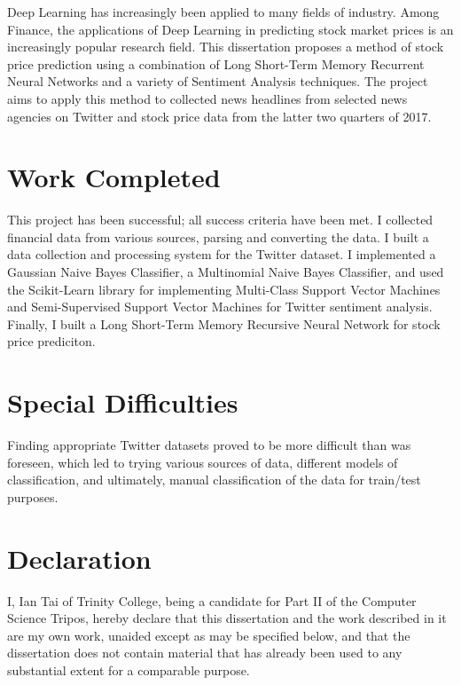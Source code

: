 \documentclass[12pt,a4paper,twoside,openright]{report}
\begin{document}
Deep Learning has increasingly been applied to many fields of industry. Among Finance,
the applications of Deep Learning in predicting stock market prices is an increasingly
popular research field. This dissertation proposes a method of stock price prediction
using a combination of Long Short-Term Memory Recurrent Neural Networks and a variety
of Sentiment Analysis techniques. The project aims to apply this method to collected 
news headlines from selected news agencies on Twitter and stock price data from the 
latter two quarters of 2017.

\section*{Work Completed}

This project has been successful; all success criteria have been met. I collected financial
data from various sources, parsing and converting the data. I 
built a data collection and processing system for the Twitter dataset. I implemented
a Gaussian Naive Bayes Classifier, a Multinomial Naive Bayes Classifier, and used the
Scikit-Learn library for implementing Multi-Class Support Vector Machines and
Semi-Supervised Support Vector Machines for Twitter sentiment analysis. Finally, I built
a Long Short-Term Memory Recursive Neural Network for stock price prediciton.

\section*{Special Difficulties}

Finding appropriate Twitter datasets proved to be more difficult than was foreseen, which led to
trying various sources of data, different models of classification, and ultimately, manual classification
of the data for train/test purposes.
 
\newpage
\section*{Declaration}

I, Ian Tai of Trinity College, being a candidate for Part II of the Computer
Science Tripos, hereby declare
that this dissertation and the work described in it are my own work,
unaided except as may be specified below, and that the dissertation
does not contain material that has already been used to any substantial
extent for a comparable purpose.

\bigskip
{}
\end{document}
